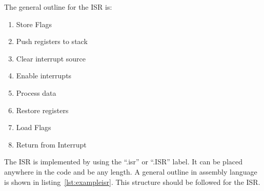 The general outline for the ISR is:
\begin{enumerate}
\item Store Flags
\item Push registers to stack
\item Clear interrupt source
\item Enable interrupts
\item Process data
\item Restore registers
\item Load Flags
\item Return from Interrupt
\end{enumerate}

The ISR is implemented by using the ``.isr'' or ``.ISR'' label. 
It can be placed anywhere in the code and be any length.
A general outline in assembly language is shown in listing~\ref{lst:exampleisr}. 
This structure should be followed for the ISR.






